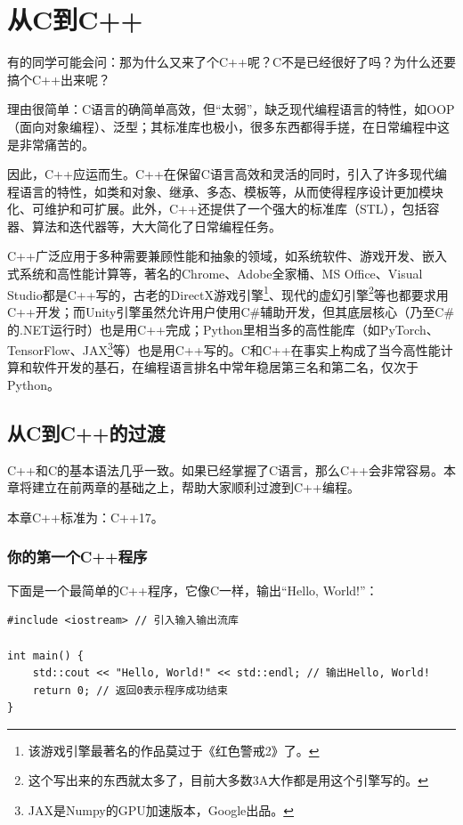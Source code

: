 \chapter{从C到C++}

有的同学可能会问：那为什么又来了个C++呢？C不是已经很好了吗？为什么还要搞个C++出来呢？

理由很简单：C语言的确简单高效，但“太弱”，缺乏现代编程语言的特性，如OOP（面向对象编程）、泛型；其标准库也极小，很多东西都得手搓，在日常编程中这是非常痛苦的。

因此，C++应运而生。C++在保留C语言高效和灵活的同时，引入了许多现代编程语言的特性，如类和对象、继承、多态、模板等，从而使得程序设计更加模块化、可维护和可扩展。此外，C++还提供了一个强大的标准库（STL），包括容器、算法和迭代器等，大大简化了日常编程任务。

C++广泛应用于多种需要兼顾性能和抽象的领域，如系统软件、游戏开发、嵌入式系统和高性能计算等，著名的Chrome、Adobe全家桶、MS Office、Visual Studio都是C++写的，古老的DirectX游戏引擎\footnote{该游戏引擎最著名的作品莫过于《红色警戒2》了。}、现代的虚幻引擎\footnote{这个写出来的东西就太多了，目前大多数3A大作都是用这个引擎写的。}等也都要求用C++开发；而Unity引擎虽然允许用户使用C\#辅助开发，但其底层核心（乃至C\#的.NET运行时）也是用C++完成；Python里相当多的高性能库（如PyTorch、TensorFlow、JAX\footnote{JAX是Numpy的GPU加速版本，Google出品。}等）也是用C++写的。C和C++在事实上构成了当今高性能计算和软件开发的基石，在编程语言排名中常年稳居第三名和第二名，仅次于Python。

\section{从C到C++的过渡}

C++和C的基本语法几乎一致。如果已经掌握了C语言，那么C++会非常容易。本章将建立在前两章的基础之上，帮助大家顺利过渡到C++编程。

本章C++标准为：C++17。

\subsection{你的第一个C++程序}

下面是一个最简单的C++程序，它像C一样，输出“Hello, World!”：
\begin{verbatim}
#include <iostream> // 引入输入输出流库

int main() {
    std::cout << "Hello, World!" << std::endl; // 输出Hello, World!
    return 0; // 返回0表示程序成功结束
}
\end{verbatim}

